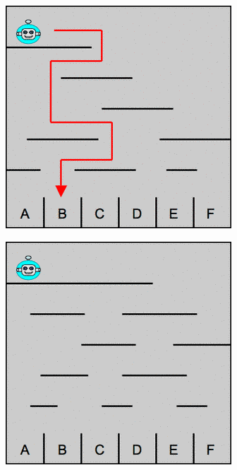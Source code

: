 \documentclass[12pt]{article}
\begin{document}
\begin{minipage}{\textwidth}
			\begin{minipage}{0.49\linewidth}
				\includegraphics[width=\linewidth]{image1}
			\end{minipage} \hfill
			\begin{minipage}{0.49\linewidth}
				\includegraphics[width=\linewidth]{image2}
			\end{minipage}

	\end{minipage} \\ \\
	
\end{document}
